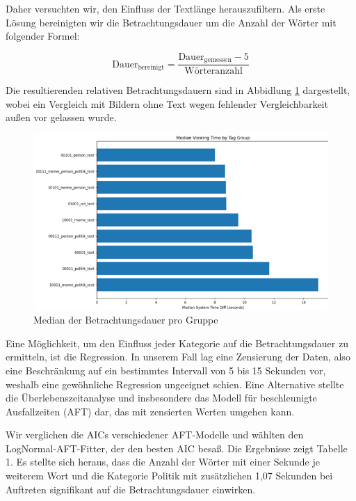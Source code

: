 \documentclass[
    language=german, %
    thesis=seminar, %
    supervisor=postdoc, %
    multiauthor=true, %
    ]{settings/csssa-thesis}
\begin{document}
Daher versuchten wir, den Einfluss der Textlänge herauszufiltern. Als erste Lösung bereinigten 
wir die Betrachtungsdauer um die Anzahl der Wörter mit folgender Formel:

\[
\text{Dauer}_{\text{bereinigt}} = \frac{\text{Dauer}_{\text{gemessen}} - 5}{\text{Wörteranzahl}}
\]


Die resultierenden relativen Betrachtungsdauern sind in Abbidlung \ref{fig:bild27} dargestellt, 
wobei ein Vergleich mit Bildern ohne Text wegen fehlender Vergleichbarkeit außen vor gelassen wurde.

\begin{figure}[h]
    \centering
    \includegraphics[width=\linewidth,height=0.8\textheight,keepaspectratio]{figures/Bild31.png}
    \caption{Median der Betrachtungsdauer pro Gruppe}
    \label{fig:bild27}
\end{figure}

Eine Möglichkeit, um den Einfluss jeder Kategorie auf die Betrachtungsdauer zu ermitteln, 
ist die Regression. In unserem Fall lag eine Zensierung der Daten, also eine Beschränkung 
auf ein bestimmtes Intervall von 5 bis 15 Sekunden vor, weshalb eine gewöhnliche Regression 
ungeeignet schien. Eine Alternative stellte die Überlebenszeitanalyse und insbesondere das Modell 
für beschleunigte Ausfallzeiten (AFT) dar, das mit zensierten Werten umgehen kann.

Wir verglichen die AICs verschiedener AFT-Modelle und wählten den LogNormal-AFT-Fitter, 
der den besten AIC besaß. Die Ergebnisse zeigt Tabelle 1. Es stellte sich heraus, dass die Anzahl 
der Wörter mit einer Sekunde je weiterem Wort und die Kategorie Politik mit zusätzlichen 1,07 Sekunden 
bei Auftreten signifikant auf die Betrachtungsdauer einwirken.
\end{document}
